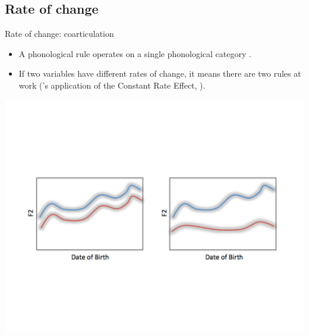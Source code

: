\documentclass[hyperref={pdfpagelabels=false}]{beamer}
\begin{document}
%
%

\subsection{Rate of change}
\begin{frame}{Rate of change: coarticulation}
	\begin{itemize} 
		\item A phonological rule operates on a single phonological category \citep{fruehwald2013}. \pause
		\item If two variables have different rates of change, it means there are two rules at work (\citealt{fruehwald2013}'s application of the Constant Rate Effect, \citealt{kroch1989}). \pause

	\end{itemize}
	\begin{center}

	\includegraphics[trim=2cm 2cm 2cm 6cm, clip=true, width=1\textwidth]{RateofChangeEx.pdf}

\end{center}\end{frame}
\end{document}
